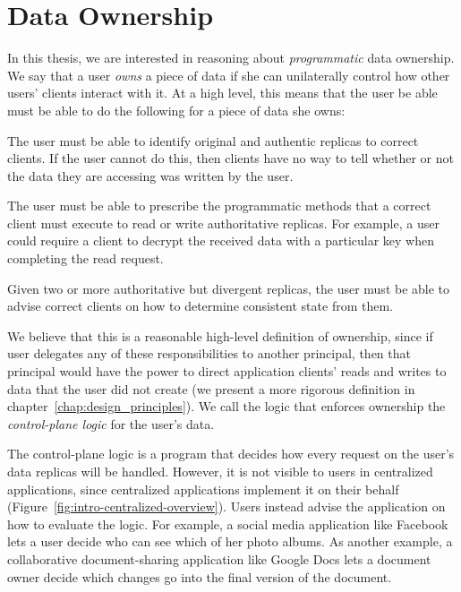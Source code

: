 \section{Data Ownership}

In this thesis, we are interested in reasoning about \emph{programmatic}
data ownership.  We say that a user
\emph{owns} a piece of data if she can unilaterally control how
other users' clients interact with it.  At a high level, this means that the
user be able must be able to do the following for a piece of data she owns:

  The user must be able to
identify original and authentic replicas to correct clients.  If the user cannot
do this, then clients have no way to tell whether or not the data they are
accessing was written by the user.

  The user must be able to prescribe
the programmatic methods that a correct client must execute to read or write authoritative
replicas.  For example, a user could require a client to decrypt the
received data with a particular key when completing the read request.

  Given two or more authoritative but divergent replicas,
the user must be able to advise correct clients on how to determine consistent
state from them.

We believe that this is a reasonable high-level definition of ownership,
since if user delegates any of these responsibilities to
another principal, then that principal would
have the power to direct application clients' reads and writes to data that the
user did not create (we present a more rigorous definition in
chapter~\ref{chap:design_principles}).
We call the logic that enforces ownership the \emph{control-plane logic} for the
user's data.

The control-plane logic is a program that decides how every request on the user's
data replicas will be handled.  However, it is not visible to users
in centralized applications,
since centralized applications implement it on their behalf
(Figure~\ref{fig:intro-centralized-overview}).  Users instead
advise the application on how to evaluate the logic.
For example, a social media
application like Facebook lets a user decide who can see which of her photo albums.  As
another example, a collaborative document-sharing application like Google Docs
lets a document owner decide which changes go into the final version of the document.

